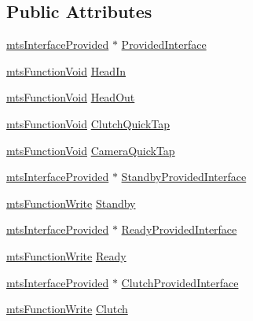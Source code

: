 \subsection*{Public Attributes}
\begin{DoxyCompactItemize}
\item 
\hyperlink{classmts_interface_provided}{mts\+Interface\+Provided} $\ast$ \hyperlink{classmts_intuitive_da_vinci_1_1_console_data_a0b3a28652722a634382d0d0ea5750e88}{Provided\+Interface}
\item 
\hyperlink{classmts_function_void}{mts\+Function\+Void} \hyperlink{classmts_intuitive_da_vinci_1_1_console_data_a5b5d17e216af2063349a16f4aaf1e9da}{Head\+In}
\item 
\hyperlink{classmts_function_void}{mts\+Function\+Void} \hyperlink{classmts_intuitive_da_vinci_1_1_console_data_a0be0b8a323ad2aa87d37651673d5f578}{Head\+Out}
\item 
\hyperlink{classmts_function_void}{mts\+Function\+Void} \hyperlink{classmts_intuitive_da_vinci_1_1_console_data_a761511254bd4bb7552555e087f62b896}{Clutch\+Quick\+Tap}
\item 
\hyperlink{classmts_function_void}{mts\+Function\+Void} \hyperlink{classmts_intuitive_da_vinci_1_1_console_data_acc1d6720edf3d31e415419be36318d5a}{Camera\+Quick\+Tap}
\item 
\hyperlink{classmts_interface_provided}{mts\+Interface\+Provided} $\ast$ \hyperlink{classmts_intuitive_da_vinci_1_1_console_data_a42526431899b8d287072e9db9a7f6e0e}{Standby\+Provided\+Interface}
\item 
\hyperlink{classmts_function_write}{mts\+Function\+Write} \hyperlink{classmts_intuitive_da_vinci_1_1_console_data_ac4e3b3234430ebffecd42aa75f26c1d9}{Standby}
\item 
\hyperlink{classmts_interface_provided}{mts\+Interface\+Provided} $\ast$ \hyperlink{classmts_intuitive_da_vinci_1_1_console_data_a38357629dbf987f86a238edf04235ace}{Ready\+Provided\+Interface}
\item 
\hyperlink{classmts_function_write}{mts\+Function\+Write} \hyperlink{classmts_intuitive_da_vinci_1_1_console_data_a0cb8ebe8516c19fac62e8911aaf4cde5}{Ready}
\item 
\hyperlink{classmts_interface_provided}{mts\+Interface\+Provided} $\ast$ \hyperlink{classmts_intuitive_da_vinci_1_1_console_data_af523bdb7ed11e8066fbb5d869fa309ee}{Clutch\+Provided\+Interface}
\item 
\hyperlink{classmts_function_write}{mts\+Function\+Write} \hyperlink{classmts_intuitive_da_vinci_1_1_console_data_a692cf3fce7a601b8fdbc88f65ccab22b}{Clutch}

\end{DoxyCompactItemize}

